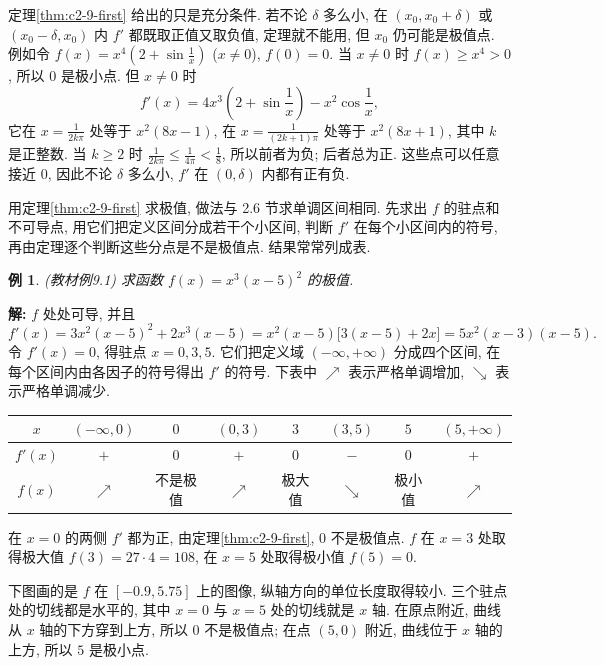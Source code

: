\documentclass[UTF8,openany]{ctexbook}
\theoremstyle{chinesetextbook}
\newtheorem{example}{例}[section]
\newenvironment{cnsolution}{\par\indent\textbf{解:} \ignorespaces}{\par}
\begin{document}
定理\ref{thm:c2-9-first} 给出的只是充分条件. 若不论 $\delta$ 多么小, 在 $(x_0,x_0+\delta)$ 或 $(x_0-\delta,x_0)$ 内 $f'$ 都既取正值又取负值, 定理就不能用, 但 $x_0$ 仍可能是极值点. 例如令 $\displaystyle f(x)=x^4\left(2+\sin\frac1x\right)$ ($x\ne0$), $f(0)=0$. 当 $x\ne0$ 时 $f(x)\ge x^4>0$, 所以 $0$ 是极小点. 但 $x\ne0$ 时
\[
f'(x)=4x^3\left(2+\sin\frac1x\right)-x^2\cos\frac1x,
\]
它在 $\displaystyle x=\frac1{2k\pi}$ 处等于 $x^2(8x-1)$, 在 $\displaystyle x=\frac1{(2k+1)\pi}$ 处等于 $x^2(8x+1)$, 其中 $k$ 是正整数. 当 $k\ge2$ 时 $\displaystyle\frac1{2k\pi}\le\frac1{4\pi}<\frac18$, 所以前者为负; 后者总为正. 这些点可以任意接近 $0$, 因此不论 $\delta$ 多么小, $f'$ 在 $(0,\delta)$ 内都有正有负.

用定理\ref{thm:c2-9-first} 求极值, 做法与 2.6 节求单调区间相同. 先求出 $f$ 的驻点和不可导点, 用它们把定义区间分成若干个小区间, 判断 $f'$ 在每个小区间内的符号, 再由定理逐个判断这些分点是不是极值点. 结果常常列成表.
\begin{example}\label{ex:c2-9-1}
\textnormal{(教材例9.1)} 求函数 $f(x)=x^3(x-5)^2$ 的极值.
\end{example}
\begin{cnsolution}
$f$ 处处可导, 并且
\[
f'(x)=3x^2(x-5)^2+2x^3(x-5)=x^2(x-5)\bigl[3(x-5)+2x\bigr]=5x^2(x-3)(x-5).
\]
令 $f'(x)=0$, 得驻点 $x=0,3,5$. 它们把定义域 $(-\infty,+\infty)$ 分成四个区间, 在每个区间内由各因子的符号得出 $f'$ 的符号. 下表中 $\nearrow$ 表示严格单调增加, $\searrow$ 表示严格单调减少.
\begin{center}
\renewcommand{\arraystretch}{1.3}
\begin{tabular}{c|c|c|c|c|c|c|c}
\hline
$x$ & $(-\infty,0)$ & $0$ & $(0,3)$ & $3$ & $(3,5)$ & $5$ & $(5,+\infty)$\\
\hline
$f'(x)$ & $+$ & $0$ & $+$ & $0$ & $-$ & $0$ & $+$\\
\hline
$f(x)$ & $\nearrow$ & 不是极值 & $\nearrow$ & 极大值 & $\searrow$ & 极小值 & $\nearrow$\\
\hline
\end{tabular}
\end{center}
在 $x=0$ 的两侧 $f'$ 都为正, 由定理\ref{thm:c2-9-first}, $0$ 不是极值点. $f$ 在 $x=3$ 处取得极大值 $f(3)=27\cdot4=108$, 在 $x=5$ 处取得极小值 $f(5)=0$.
\end{cnsolution}
下图画的是 $f$ 在 $[-0.9,5.75]$ 上的图像, 纵轴方向的单位长度取得较小. 三个驻点处的切线都是水平的, 其中 $x=0$ 与 $x=5$ 处的切线就是 $x$ 轴. 在原点附近, 曲线从 $x$ 轴的下方穿到上方, 所以 $0$ 不是极值点; 在点 $(5,0)$ 附近, 曲线位于 $x$ 轴的上方, 所以 $5$ 是极小点.
\begin{center}
\end{center}
\end{document}

